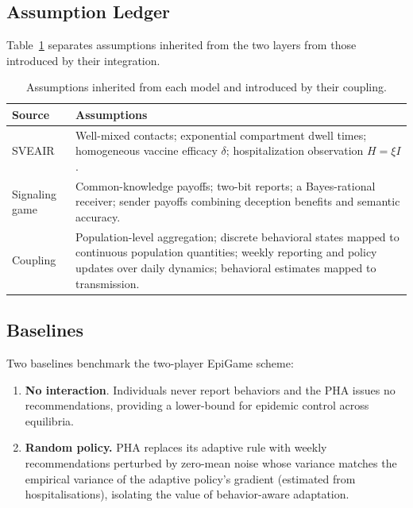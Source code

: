 \documentclass[sigconf,review]{acmart}
\newcommand{\model}{EpiGame}
\begin{document}
\subsection{Assumption Ledger}
Table~\ref{tab:coupling-assumptions} separates assumptions inherited from the two layers from those introduced by their integration.
\begin{table}[tbp]
\centering
\caption{Assumptions inherited from each model and introduced
by their coupling.}
\label{tab:coupling-assumptions}
\small
\setlength{\tabcolsep}{3pt}
\renewcommand{\arraystretch}{1.02}
\begin{tabularx}{\columnwidth}{
@{}
>{\raggedright\arraybackslash}p{}
>{\raggedright\arraybackslash}X
@{}}
\toprule
\textbf{Source} & \textbf{Assumptions} \\
\midrule
SVEAIR
& Well-mixed contacts; exponential compartment dwell times;
homogeneous vaccine efficacy $\delta$;
hospitalization observation $H=\xi I$. \\
\midrule
Signaling game
& Common-knowledge payoffs; two-bit reports;
a Bayes-rational receiver; sender payoffs combining
deception benefits and semantic accuracy. \\
\midrule
Coupling
& Population-level aggregation; discrete behavioral states
mapped to continuous population quantities;
weekly reporting and policy updates over daily dynamics;
behavioral estimates mapped to transmission. \\
\bottomrule
\end{tabularx}
\end{table}

\subsection{Baselines} 
Two baselines benchmark the two-player \model{} scheme:

\begin{enumerate}
\item {\bf No interaction}. Individuals never report behaviors and the PHA issues no recommendations, providing a lower-bound for epidemic control across equilibria.

\item {\bf Random policy.} PHA replaces its adaptive rule with weekly recommendations perturbed by zero-mean noise whose variance matches the empirical variance of the adaptive policy's gradient (estimated from hospitalisations), isolating the value of behavior-aware adaptation.
\end{enumerate}
\end{document}
